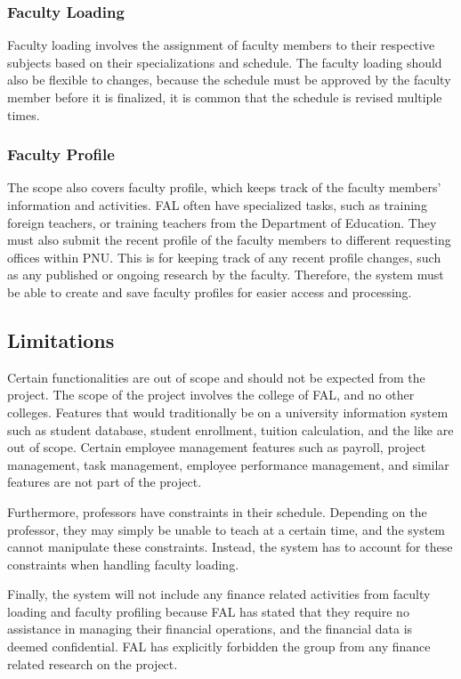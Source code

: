 \subsubsection{Faculty Loading}
Faculty loading involves the assignment of faculty members to their respective subjects based on their specializations and schedule. The faculty loading should also be flexible to changes, because the schedule must be approved by the faculty member before it is finalized, it is common that the schedule is revised multiple times. 

\subsubsection{Faculty Profile}
The scope also covers faculty profile, which keeps track of the faculty members' information and activities. FAL often have specialized tasks, such as training foreign teachers, or training teachers from the Department of Education. They must also submit the recent profile of the faculty members to different requesting offices within PNU. This is for keeping track of any recent profile changes, such as any published or ongoing research by the faculty. Therefore, the system must be able to create and save faculty profiles for easier access and processing.

\subsection{Limitations}
Certain functionalities are out of scope and should not be expected from the project. The scope of the project involves the college of FAL, and no other colleges. Features that would traditionally be on a university information system such as student database, student enrollment, tuition calculation, and the like are out of scope. Certain employee management features such as payroll, project management, task management, employee performance management, and similar features are not part of the project.

Furthermore, professors have constraints in their schedule. Depending on the professor, they may simply be unable to teach at a certain time, and the system cannot manipulate these constraints. Instead, the system has to account for these constraints when handling faculty loading.

Finally, the system will not include any finance related activities from faculty loading and faculty profiling because FAL has stated that they require no assistance in managing their financial operations, and the financial data is deemed confidential.  FAL has explicitly forbidden the group from any finance related research on the project.